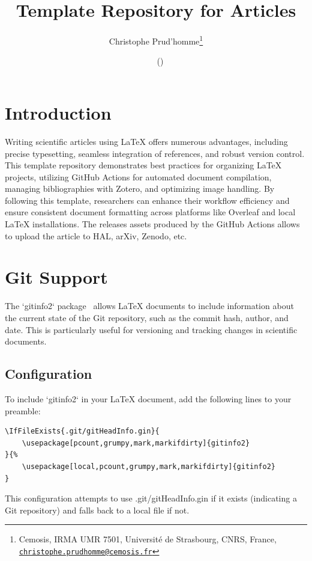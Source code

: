 \documentclass[a4paper]{article}
\title{Template Repository for Articles}
\author{Christophe Prud'homme\thanks{Cemosis, IRMA UMR 7501, Université de Strasbourg, CNRS, France, \tt \href{mailto:christophe.prudhomme@cemosis.fr}{christophe.prudhomme@cemosis.fr}}}
\date{\gitReln\  \gitAuthorDate\ (\gitAbbrevHash)}
\begin{document}
\maketitle
\tableofcontents

\section{Introduction}
\label{sec:introduction}

Writing scientific articles using \LaTeX{} offers numerous advantages, including precise typesetting, seamless integration of references, and robust version control.
This template repository demonstrates best practices for organizing \LaTeX{} projects, utilizing GitHub Actions for automated document compilation, managing bibliographies with Zotero, and optimizing image handling.
By following this template, researchers can enhance their workflow efficiency and ensure consistent document formatting across platforms like Overleaf and local \LaTeX{} installations.
The releases assets produced by the GitHub Actions allows to upload the article to HAL, arXiv, Zenodo, etc.



\section{Git Support}
\label{sec:git-support}

The `gitinfo2` package~\citep{brent_longborough_gitinfo2sty_2015} allows \LaTeX{} documents to include information about the current state of the Git repository, such as the commit hash, author, and date. This is particularly useful for versioning and tracking changes in scientific documents.

\subsection{Configuration}

To include `gitinfo2` in your \LaTeX{} document, add the following lines to your preamble:

\begin{verbatim}
\IfFileExists{.git/gitHeadInfo.gin}{
    \usepackage[pcount,grumpy,mark,markifdirty]{gitinfo2}
}{%
    \usepackage[local,pcount,grumpy,mark,markifdirty]{gitinfo2}
}
\end{verbatim}

This configuration attempts to use .git/gitHeadInfo.gin if it exists (indicating a Git repository) and falls back to a local file if not.
\end{document}
